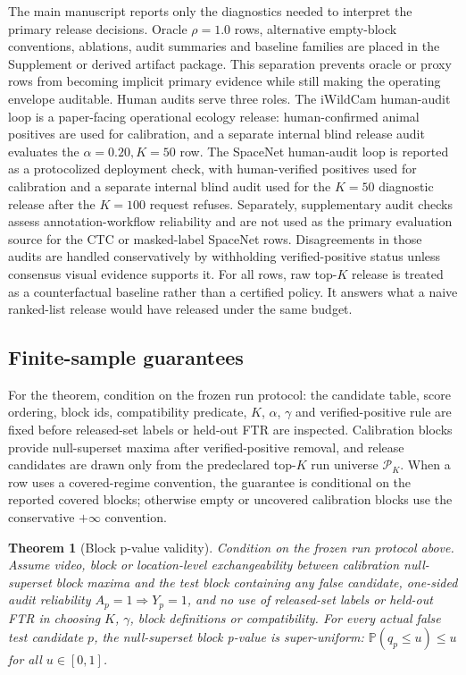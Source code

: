 \documentclass[10pt,twocolumn]{article}
\newtheorem{theorem}{Theorem}
\newcommand{\Pcal}{\mathcal P}
\newcommand{\Prob}{\mathbb P}
\begin{document}
The main manuscript reports only the diagnostics needed to interpret the primary release decisions.
Oracle \(\rho=1.0\) rows, alternative empty-block conventions, ablations, audit summaries and baseline families are placed in the Supplement or derived artifact package.
This separation prevents oracle or proxy rows from becoming implicit primary evidence while still making the operating envelope auditable.
Human audits serve three roles.
The iWildCam human-audit loop is a paper-facing operational ecology release: human-confirmed animal positives are used for calibration, and a separate internal blind release audit evaluates the \(\alpha=0.20,K=50\) row.
The SpaceNet human-audit loop is reported as a protocolized deployment check, with human-verified positives used for calibration and a separate internal blind audit used for the \(K=50\) diagnostic release after the \(K=100\) request refuses.
Separately, supplementary audit checks assess annotation-workflow reliability and are not used as the primary evaluation source for the CTC or masked-label SpaceNet rows.
Disagreements in those audits are handled conservatively by withholding verified-positive status unless consensus visual evidence supports it.
For all rows, raw top-\(K\) release is treated as a counterfactual baseline rather than a certified policy.
It answers what a naive ranked-list release would have released under the same budget.

\subsection{Finite-sample guarantees}

For the theorem, condition on the frozen run protocol: the candidate table, score ordering, block ids, compatibility predicate, \(K\), \(\alpha\), \(\gamma\) and verified-positive rule are fixed before released-set labels or held-out FTR are inspected.
Calibration blocks provide null-superset maxima after verified-positive removal, and release candidates are drawn only from the predeclared top-\(K\) run universe \(\Pcal_K\).
When a row uses a covered-regime convention, the guarantee is conditional on the reported covered blocks; otherwise empty or uncovered calibration blocks use the conservative \(+\infty\) convention.

\begin{theorem}[Block p-value validity]
Condition on the frozen run protocol above.
Assume video, block or location-level exchangeability between calibration null-superset block maxima and the test block containing any false candidate, one-sided audit reliability \(A_p=1\Rightarrow Y_p=1\), and no use of released-set labels or held-out FTR in choosing \(K\), \(\gamma\), block definitions or compatibility.
For every actual false test candidate \(p\), the null-superset block p-value is super-uniform: \(\Prob(q_p\le u)\le u\) for all \(u\in[0,1]\).
\end{theorem}
\end{document}
